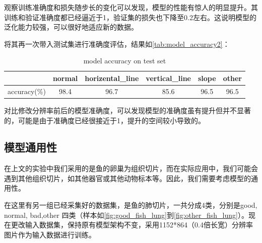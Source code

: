 观察训练准确度和损失随步长的变化可以发现，模型的性能有惊人的明显提升。其训练和验证准确度都已经逼近于1，验证集的损失也下降至0.2左右。这说明模型的泛化能力较强，可以很好地适应新的数据。


将其再一次带入测试集进行准确度评估，结果如\autoref{tab:model_accuracy2}：

\begin{table}
    \centering
    \caption{model accuracy on test set}
    \begin{tabular}{cccccc}
        \toprule
        & normal & horizental\_line & vertical\_line & slope & other \\
        \midrule
        accuracy(\%) & 98.4 & 96.7 & 85.6 & 96.5 & 96.5 \\
        \bottomrule
    \end{tabular}
    \label{tab:model_accuracy2}
    \end{table}

    对比修改分辨率前后的模型准确度，可以发现模型的准确度虽有提升但并不显著的，可能是由于准确度已经很接近于1，提升的空间较小导致的。


\subsection{模型通用性}

在上文的实验中我们采用的是鱼的卵巢为组织切片，而在实际应用中，我们可能会遇到其他组织切片，如其他器官或其他动物标本等。因此，我们需要考虑模型的通用性。

在这里有另一组已经采集好的数据集，是鱼的肺切片，一共分成4类，分别是good, normal, bad,other 四类（样本如\autoref{fig:good_fish_lung}到\autoref{fig:other_fish_lung}）。现在更改输入数据集，保持原有模型架构不变，采用1152*864（0.4倍长宽）分辨率图片作为输入数据进行训练。

